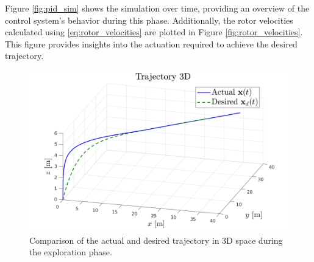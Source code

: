 Figure \ref{fig:pid_sim} shows the simulation over time, providing an overview of the control system's behavior during this phase. Additionally, the rotor velocities calculated using \eqref{eq:rotor_velocities} are plotted in Figure \ref{fig:rotor_velocities}. This figure provides insights into the actuation required to achieve the desired trajectory.

\begin{figure}[h!]
    \centering
    \includegraphics[width=1\textwidth]{images/traj_comparison.png}
    \caption[3D Trajectory Tracking]{Comparison of the actual and desired trajectory in 3D space during the exploration phase.}
    \label{fig:pd_traj_comparison}
\end{figure}

